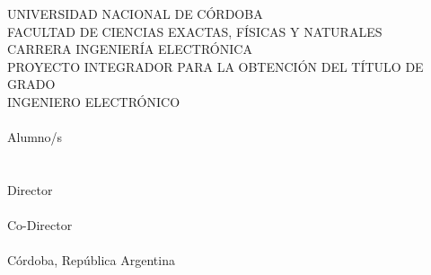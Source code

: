 \thispagestyle{empty}

\begin{center}
UNIVERSIDAD NACIONAL DE CÓRDOBA\\
FACULTAD DE CIENCIAS EXACTAS, FÍSICAS Y NATURALES\\
CARRERA INGENIERÍA ELECTRÓNICA\\[2cm]

PROYECTO INTEGRADOR PARA LA OBTENCIÓN DEL TÍTULO DE GRADO\\
INGENIERO ELECTRÓNICO\\[2cm]

{\bfseries\MakeUppercase{\tituloPI}}\\[2cm]

Alumno/s\\
\alumnoA\\
\alumnoB\\[1cm]

Director\\
\directorPI\\[1cm]

Co-Director\\
\codirectorPI\\[2cm]

Córdoba, República Argentina\\
\mesanio
\end{center}
